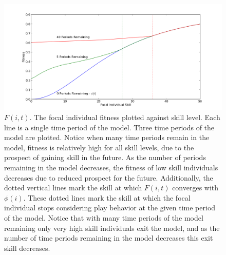 \begin{figure}[h]
\begin{center}
\caption{$F(i,t)$. The focal individual fitness plotted against skill level. Each line is a single time period of the model. Three time periods of the model are plotted. Notice when many time periods remain in the model, fitness is relatively high for all skill levels, due to the prospect of gaining skill in the future. As the number of periods remaining in the model decreases, the fitness of low skill individuals decreases due to reduced prospect for the future. Additionally, the dotted vertical lines mark the skill at which $F(i,t)$ converges with $\phi(i)$. These dotted lines mark the skill at which the focal individual stops considering play behavior at the given time period of the model. Notice that with many time periods of the model remaining only very high skill individuals exit the model, and as the number of time periods remaining in the model decreases this exit skill decreases.  }
\includegraphics[width=160mm]{fitness.png}
\end{center}
\label{fit}
\end{figure}



